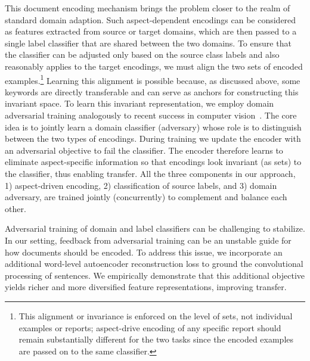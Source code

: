 This document encoding mechanism brings the problem closer to the realm of standard domain adaption. Such aspect-dependent encodings can be considered as features extracted from source or target domains, which are then passed to a single label classifier that are shared between the two domains. To ensure that the classifier can be adjusted only based on the source class labels and also reasonably applies to the target encodings, we must align the two sets of encoded examples.\footnote{This alignment or invariance is enforced on the level of sets, not individual examples or reports; aspect-drive encoding of any specific report should remain substantially different for the two tasks since the encoded examples are passed on to the same classifier.}  Learning this alignment is possible because, as discussed above, some keywords are directly transferable and can serve as anchors for constructing this invariant space. To learn this invariant representation, we employ domain adversarial training analogously to recent success in computer vision~\cite{ganin2014unsupervised}. The core idea is to jointly learn a domain classifier (adversary) whose role is to distinguish between the two types of encodings. During training we update the encoder with an adversarial objective to fail the classifier. The encoder therefore learns to eliminate aspect-specific information so that encodings look invariant (as sets) to the classifier, thus enabling transfer. All the three components in our approach, 1) aspect-driven encoding, 2) classification of source labels, and 3) domain adversary, are trained jointly (concurrently) to complement and balance each other.

Adversarial training of domain and label classifiers can be challenging to stabilize. In our setting, feedback from adversarial training can be an unstable guide for how documents should be encoded. To address this issue, we incorporate an additional word-level autoencoder reconstruction loss to ground the convolutional processing of sentences. We empirically demonstrate that this additional objective yields richer and more diversified feature representations, improving transfer. 
